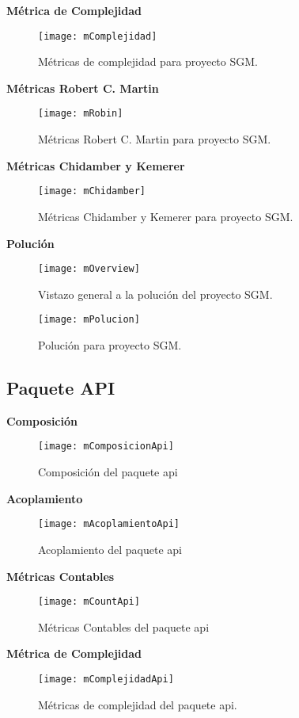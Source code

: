 \clearpage

\textbf{Métrica de Complejidad}
\begin{figure}[H]
	\centering
	\texttt{[image: mComplejidad]}
	\centering
	\caption{Métricas de complejidad para proyecto SGM.}
	\label{fig:mComplejidad}
\end{figure}

\textbf{Métricas Robert C. Martin}
\begin{figure}[H]
	\centering
	\texttt{[image: mRobin]}
	\centering
	\caption{Métricas Robert C. Martin para proyecto SGM.}
	\label{fig:mRobin}
\end{figure}
\textbf{Métricas Chidamber y Kemerer}
\begin{figure}[H]
	\centering
	\texttt{[image: mChidamber]}
	\centering
	\caption{Métricas Chidamber y Kemerer para proyecto SGM.}
	\label{fig:mChidamber}
\end{figure}
\clearpage
\textbf{Polución}
\begin{figure}[H]
	\centering
	\texttt{[image: mOverview]}
	\centering
	\caption{Vistazo general a la polución del proyecto SGM.}
	\label{fig:mOverview}
\end{figure}
\begin{figure}[H]
	\centering
	\texttt{[image: mPolucion]}
	\centering
	\caption{Polución para proyecto SGM.}
	\label{fig:mChidamber}
\end{figure}
\newpage
\subsection{Paquete API}

\textbf{Composición}
\begin{figure}[H]
	\centering
	\texttt{[image: mComposicionApi]}
	\centering
	\caption{Composición del paquete api}
	\label{fig:mComposicionApi}
\end{figure}
\textbf{Acoplamiento}
\begin{figure}[H]
	\centering
	\texttt{[image: mAcoplamientoApi]}
	\centering
	\caption{Acoplamiento del paquete api}
	\label{fig:mAcoplamientoApi}
\end{figure}
\textbf{Métricas Contables}
\begin{figure}[H]
	\centering
	\texttt{[image: mCountApi]}
	\centering
	\caption{Métricas Contables del paquete api}
	\label{fig:mCountApi}
\end{figure}
\textbf{Métrica de Complejidad}
\begin{figure}[H]
	\centering
	\texttt{[image: mComplejidadApi]}
	\centering
	\caption{Métricas de complejidad del paquete api.}
	\label{fig:mComplejidadApi}
\end{figure}

